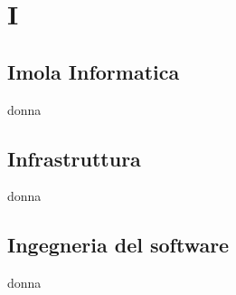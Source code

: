 \section{I} 
\subsection{Imola Informatica} 
donna
\subsection{Infrastruttura} 
donna
\subsection{Ingegneria del software} 
donna
